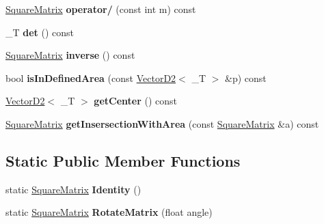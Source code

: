 \begin{DoxyCompactItemize}
\item 
\hypertarget{class_square_matrix_ac73060d81ecfd50833721fc7019d3ab6}{
\hyperlink{class_square_matrix}{SquareMatrix} {\bfseries operator/} (const int m) const }
\label{class_square_matrix_ac73060d81ecfd50833721fc7019d3ab6}

\item 
\hypertarget{class_square_matrix_ab9c523e15796ce413ff625bcb819f0f6}{
\_\-T {\bfseries det} () const }
\label{class_square_matrix_ab9c523e15796ce413ff625bcb819f0f6}

\item 
\hypertarget{class_square_matrix_a42efa03b08c2f239e04b14a7ed3dea0f}{
\hyperlink{class_square_matrix}{SquareMatrix} {\bfseries inverse} () const }
\label{class_square_matrix_a42efa03b08c2f239e04b14a7ed3dea0f}

\item 
\hypertarget{class_square_matrix_a0dc910e08b19d8c571293f3bb4ebd36c}{
bool {\bfseries isInDefinedArea} (const \hyperlink{struct_vector_d2}{VectorD2}$<$ \_\-T $>$ \&p) const }
\label{class_square_matrix_a0dc910e08b19d8c571293f3bb4ebd36c}

\item 
\hypertarget{class_square_matrix_ac66eecb2e4887b66838b8cd4006fe13a}{
\hyperlink{struct_vector_d2}{VectorD2}$<$ \_\-T $>$ {\bfseries getCenter} () const }
\label{class_square_matrix_ac66eecb2e4887b66838b8cd4006fe13a}

\item 
\hypertarget{class_square_matrix_a60ff1f3c3fc03ba2006de5fd2eb992ca}{
\hyperlink{class_square_matrix}{SquareMatrix} {\bfseries getInsersectionWithArea} (const \hyperlink{class_square_matrix}{SquareMatrix} \&a) const }
\label{class_square_matrix_a60ff1f3c3fc03ba2006de5fd2eb992ca}

\end{DoxyCompactItemize}
\subsection*{Static Public Member Functions}
\begin{DoxyCompactItemize}
\item 
\hypertarget{class_square_matrix_a6f298dc040eb3c2090137064f86650d9}{
static \hyperlink{class_square_matrix}{SquareMatrix} {\bfseries Identity} ()}
\label{class_square_matrix_a6f298dc040eb3c2090137064f86650d9}

\item 
\hypertarget{class_square_matrix_aa1ea9ad82b563eec3829cce18117c764}{
static \hyperlink{class_square_matrix}{SquareMatrix} {\bfseries RotateMatrix} (float angle)}
\label{class_square_matrix_aa1ea9ad82b563eec3829cce18117c764}

\end{DoxyCompactItemize}
